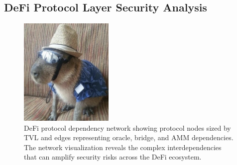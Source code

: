\subsection{DeFi Protocol Layer Security Analysis}
\label{sec:results_defi_protocol}


\begin{figure}[H]
\centering
\includegraphics[width=0.4\textwidth]{../figure/fig3.png}
\caption{DeFi protocol dependency network showing protocol nodes sized by TVL and edges representing oracle, bridge, and AMM dependencies. The network visualization reveals the complex interdependencies that can amplify security risks across the DeFi ecosystem.}
\label{fig:defi_network_dependencies}
\end{figure}
